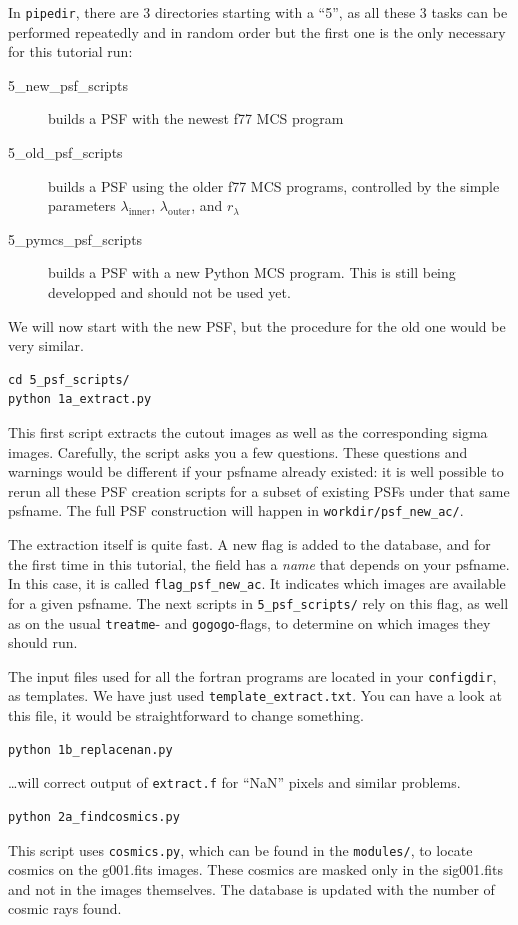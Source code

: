 In \verb+pipedir+, there are 3 directories starting with a ``5'', as all these 3 tasks can be performed repeatedly and in random order but the first one is the only necessary for this tutorial run:
\begin{description}
\item[5\_new\_psf\_scripts] builds a PSF with the newest f77 MCS program
\item[5\_old\_psf\_scripts] builds a PSF using the older f77 MCS programs, controlled by the simple parameters $\lambda_{\mathrm{inner}}$, $\lambda_{\mathrm{outer}}$, and $r_{\lambda}$
\item[5\_pymcs\_psf\_scripts] builds a PSF with a new Python MCS program. This is still being developped and should not be used yet.
\end{description}
We will now start with the new PSF, but the procedure for the old one would be very similar.

\begin{Verbatim}
cd 5_psf_scripts/
python 1a_extract.py
\end{Verbatim}
This first script extracts the cutout images as well as the corresponding sigma images.
Carefully, the script asks you a few questions. These questions and warnings would be different if your psfname already existed: it is well possible to rerun all these PSF creation scripts for a subset of existing PSFs under that same psfname. The full PSF construction will happen in \verb+workdir/psf_new_ac/+.

The extraction itself is quite fast. A new flag is added to the database, and for the first time in this tutorial, the field has a \emph{name} that depends on your psfname. In this case, it is called \verb+flag_psf_new_ac+. It indicates which images are available for a given psfname. The next scripts in \verb+5_psf_scripts/+ rely on this flag, as well as on the usual \verb+treatme+- and \verb+gogogo+-flags, to determine on which images they should run.

The input files used for all the fortran programs are located in your \verb+configdir+, as templates. We have just used \verb+template_extract.txt+. You can have a look at this file, it would be straightforward to change something.

\begin{Verbatim}
python 1b_replacenan.py
\end{Verbatim}
\ldots will correct output of \verb+extract.f+ for ``NaN'' pixels and similar problems.

\begin{Verbatim}
python 2a_findcosmics.py
\end{Verbatim}
This script uses \verb+cosmics.py+, which can be found in the \verb+modules/+, to locate cosmics on the g001.fits images. These cosmics are masked only in the sig001.fits and not in the images themselves. The database is updated with the number of cosmic rays found.

